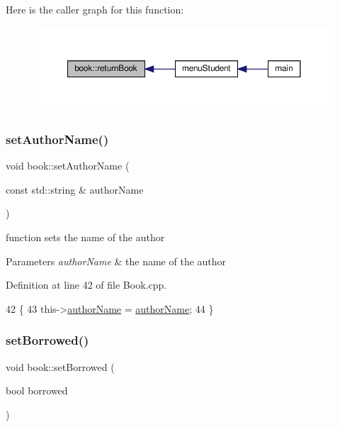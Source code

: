Here is the caller graph for this function\+:
\nopagebreak
\begin{figure}[H]
\begin{center}
\leavevmode
\includegraphics[width=350pt]{classbook_af11d02d9964b788986dc8e26d1cdf373_icgraph}
\end{center}
\end{figure}
\mbox{\label{classbook_ab6da44e6c1680a8e802a14c2fcd20e78}} 
\subsubsection{\texorpdfstring{set\+Author\+Name()}{setAuthorName()}}
{\footnotesize\ttfamily void book\+::set\+Author\+Name (\begin{DoxyParamCaption}\item[{const std\+::string \&}]{author\+Name }\end{DoxyParamCaption})}

function sets the name of the author 
\begin{DoxyParams}{Parameters}
{\em author\+Name} & the name of the author \\
\hline
\end{DoxyParams}


Definition at line 42 of file Book.\+cpp.


\begin{DoxyCode}
42                                                     \{
43     this->\hyperlink{classbook_a21b2962c6227818732db27f12121b732}{authorName} = \hyperlink{classbook_a21b2962c6227818732db27f12121b732}{authorName};
44 \}
\end{DoxyCode}
\mbox{\label{classbook_a7deed8c0520ef6f6b1dd5ebf9345cc72}} 
\subsubsection{\texorpdfstring{set\+Borrowed()}{setBorrowed()}}
{\footnotesize\ttfamily void book\+::set\+Borrowed (\begin{DoxyParamCaption}\item[{bool}]{borrowed }\end{DoxyParamCaption})}

